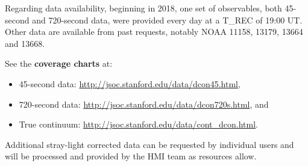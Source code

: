 \documentclass[trackchanges]{aastex62}
\begin{document}
Regarding data availability, beginning in 2018, one set of observables, both 45-second and 720-second data, were provided every day at a T\_REC of 19:00 UT. Other data are available from past requests, notably NOAA 11158, 13179, 13664 and 13668. 

See the \textbf{coverage charts} at:
\begin{itemize}
\item 45-second data: \href{http://jsoc.stanford.edu/data/dcon45.html}{http://jsoc.stanford.edu/data/dcon45.html},
  \item 720-second data: \href{http://jsoc.stanford.edu/data/dcon720s.html}{http://jsoc.stanford.edu/data/dcon720s.html}, and 
  \item True continuum: \href{http://jsoc.stanford.edu/data/cont_dcon.html}{http://jsoc.stanford.edu/data/cont\_dcon.html}.
\end{itemize}

Additional stray-light corrected data can be requested by individual users and will be processed and provided by the HMI team as resources allow.
\end{document}
